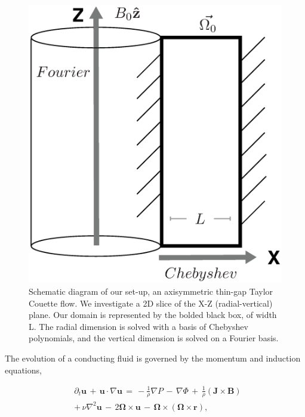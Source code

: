 \documentclass{emulateapj}
\newcommand{\beq}{\begin{equation}}
\newcommand{\eeq}{\end{equation}}
\begin{document}
\begin{figure}[h!]
\centering
\includegraphics[trim=5cm 0cm 0cm 0cm, scale=.35]{setup_diagram.eps}
\caption{Schematic diagram of our set-up, an axisymmetric thin-gap Taylor Couette flow. We investigate a 2D slice of the X-Z (radial-vertical) plane. Our domain is represented by the bolded black box, of width L. The radial dimension is solved with a basis of Chebyshev polynomials, and the vertical dimension is solved on a Fourier basis. }\label{fig:setup}
\end{figure}


The evolution of a conducting fluid is governed by the momentum and induction equations,

\beq\label{eq:momentum}
\begin{split}
& \partial_t \mathbf{u} \, + \, \mathbf{u} \cdot \nabla \mathbf{u} \, = \, -\frac{1}{\rho}\nabla P \, - \, \nabla\Phi \, + \, \frac{1}{\rho} \left(\mathbf{J}\times\mathbf{B}\right) \, \\
& + \, \nu\nabla^2 \mathbf{u} \, - \, 2\mathbf{\Omega} \times \mathbf{u} \, - \, \mathbf{\Omega} \times \left(\mathbf{\Omega} \times \mathbf{r} \right), \\
\end{split}
\eeq
\end{document}
